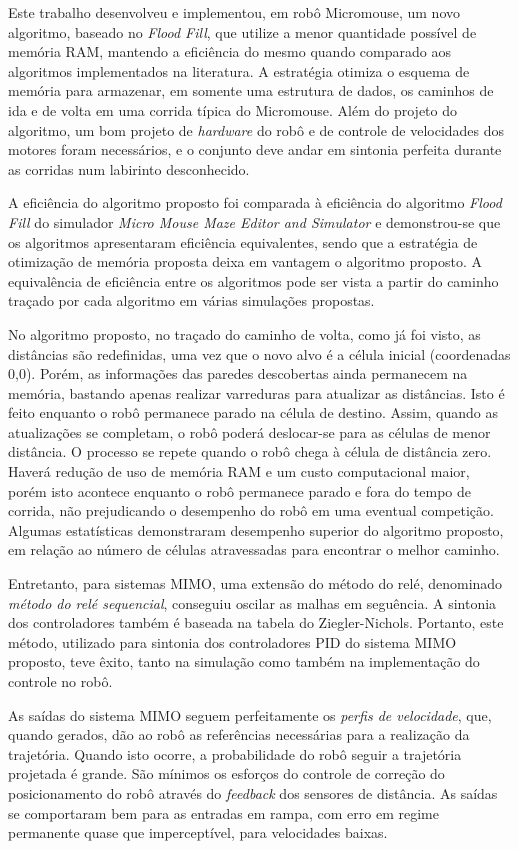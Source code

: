 Este trabalho desenvolveu e implementou, em robô Micromouse, um novo algoritmo, baseado no \emph{Flood Fill}, que utilize a menor quantidade possível de memória RAM, mantendo a eficiência do mesmo quando comparado aos algoritmos implementados na literatura. A estratégia otimiza o esquema de memória para armazenar, em somente uma estrutura de dados, os caminhos de ida e de volta em uma corrida típica do Micromouse. Além do projeto do algoritmo, um bom projeto de \emph{hardware} do robô e de controle de velocidades dos motores foram necessários, e o conjunto deve andar em sintonia perfeita durante as corridas num labirinto desconhecido.

A eficiência do algoritmo proposto foi comparada à eficiência do algoritmo \emph{Flood Fill} do simulador \emph{Micro Mouse Maze Editor and Simulator} e demonstrou-se que os algoritmos apresentaram eficiência equivalentes, sendo que a estratégia de otimização de memória proposta deixa em vantagem o algoritmo proposto. A equivalência de eficiência entre os algoritmos pode ser vista a partir do caminho traçado por cada algoritmo em várias simulações propostas.

No algoritmo proposto, no traçado do caminho de volta, como já foi visto, as distâncias são redefinidas, uma vez que o novo alvo é a célula inicial (coordenadas 0,0). Porém, as informações das paredes descobertas ainda permanecem na memória, bastando apenas realizar varreduras para atualizar as distâncias. Isto é feito enquanto o robô permanece parado na célula de destino. Assim, quando as atualizações se completam, o robô poderá deslocar-se para as células de menor distância. O processo se repete quando o robô chega à célula de distância zero. Haverá redução de uso de memória RAM e um custo computacional maior, porém isto acontece enquanto o robô permanece parado e fora do tempo de corrida, não prejudicando o desempenho do robô em uma eventual competição. Algumas estatísticas demonstraram desempenho superior do algoritmo proposto, em relação ao número de células atravessadas para encontrar o melhor caminho.

Entretanto, para sistemas MIMO, uma extensão do método do relé, denominado \emph{método do relé sequencial}, conseguiu oscilar as malhas em seguência. A sintonia dos controladores também é baseada na tabela do Ziegler-Nichols. Portanto, este método, utilizado para sintonia dos controladores PID do sistema MIMO proposto, teve êxito, tanto na simulação como também na implementação do controle no robô. 

As saídas do sistema MIMO seguem perfeitamente os \emph{perfis de velocidade}, que, quando gerados, dão ao robô as referências necessárias para a realização da trajetória. Quando isto ocorre, a probabilidade do robô seguir a trajetória projetada é grande. São mínimos os esforços do controle de correção do posicionamento do robô através do \emph{feedback} dos sensores de distância. As saídas se comportaram bem para as entradas em rampa, com erro em regime permanente quase que imperceptível, para velocidades baixas.

